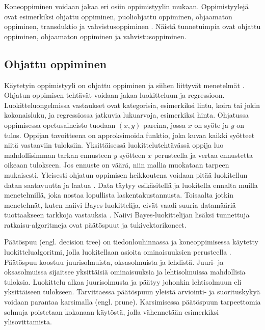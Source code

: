 \documentclass[utf8]{gradu3}
\begin{document}
Koneoppiminen voidaan jakaa eri osiin oppimistyylin mukaan. Oppimistyylejä ovat esimerkiksi ohjattu oppiminen, puoliohjattu oppiminen, ohjaamaton oppiminen, transduktio ja vahvistusoppiminen \parencite{das2017survey}. Näistä tunnetuimpia ovat ohjattu oppiminen, ohjaamaton oppiminen ja vahvistusoppiminen.

\subsection{Ohjattu oppiminen}

Käytetyin oppimistyyli on ohjattu oppiminen ja siihen liittyvät menetelmät \parencite{jordan2015machine,nasteski2017overview}. Ohjatun oppimisen tehtävät voidaan jakaa luokitteluun ja regressioon. Luokitteluongelmissa vastaukset ovat kategorisia, esimerkiksi lintu, koira tai jokin kokonaisluku, ja regressiossa jatkuvia lukuarvoja, esimerkiksi hinta. Ohjatussa oppimisessa opetusaineisto tuodaan \((x,y)\) pareina, jossa \(x\) on syöte ja \(y\) on tulos. Oppijan tavoitteena on approksimoida funktio, joka kuvaa kaikki syötteet niitä vastaaviin tuloksiin. Yksittäisessä luokittelutehtävässä oppija luo mahdollisimman tarkan ennusteen \(y\) syötteen \(x\) perusteella ja vertaa ennustetta oikeaan tulokseen. Jos ennuste on väärä, niin mallia muokataan tarpeen mukaisesti. Yleisesti ohjatun oppimisen heikkoutena voidaan pitää luokitellun datan saatavuutta ja laatua \parencite{das2017survey}. Data täytyy esikäsitellä ja luokitella ennalta muilla menetelmillä, joka nostaa lopullista laskentakustannusta. Toisaalta jotkin menetelmät, kuten naiivi Bayes-luokittelija, eivät vaadi suuria datamääriä tuottaakseen tarkkoja vastauksia \parencite{osisanwo2017supervised}. Naiivi Bayes-luokittelijan lisäksi tunnettuja ratkaisu-algoritmeja ovat päätöspuut ja tukivektorikoneet.

Päätöspuu (engl. decision tree) on tiedonlouhinnassa ja koneoppimisessa käytetty luokittelualgoritmi, jolla luokitellaan asioita ominaisuuksien perusteella \parencite{nasteski2017overview,osisanwo2017supervised}. Päätöspuu koostuu juurisolmuista, oksasolmuista ja lehdistä. Juuri- ja oksasolmuissa sijaitsee yksittäisiä ominaisuuksia ja lehtisolmuissa mahdollisia tuloksia. Luokittelu alkaa juurisolmusta ja päätyy johonkin lehtisolmuun eli yksittäiseen tulokseen. Tarvittaessa päätöspuun yleistä arviointi- ja suorituskykyä voidaan parantaa karsimalla (engl. prune). Karsimisessa päätöspuun tarpeettomia solmuja poistetaan kokonaan käytöstä, jolla vähennetään esimerkiksi ylisovittamista.
\end{document}
